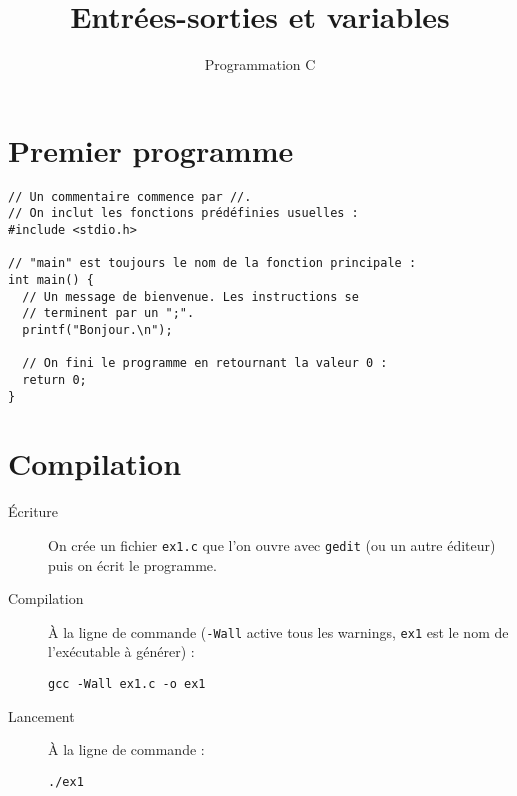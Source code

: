 \documentclass[a4paper,11pt]{article}
\begin{document}
  \title{Entrées-sorties et variables}
  \author{Programmation C}
  \date{}
  \maketitle
  
  \section{Premier programme}
  \begin{verbatim}
// Un commentaire commence par //.
// On inclut les fonctions prédéfinies usuelles :
#include <stdio.h>

// "main" est toujours le nom de la fonction principale :
int main() {
  // Un message de bienvenue. Les instructions se
  // terminent par un ";".
  printf("Bonjour.\n");
  
  // On fini le programme en retournant la valeur 0 :
  return 0;
}
  \end{verbatim}
  
  \section{Compilation}
  \begin{description}
    \item[Écriture] On crée un fichier \texttt{ex1.c} que l'on ouvre avec \texttt{gedit} (ou un autre éditeur) puis on écrit le programme.
    \item[Compilation] À la ligne de commande (\texttt{-Wall} active tous les warnings, \texttt{ex1} est le nom de l'exécutable à générer) :
      \begin{verbatim}
gcc -Wall ex1.c -o ex1
      \end{verbatim}
    \item[Lancement] À la ligne de commande :
      \begin{verbatim}
./ex1
      \end{verbatim}
  \end{description}
  
\end{document}
